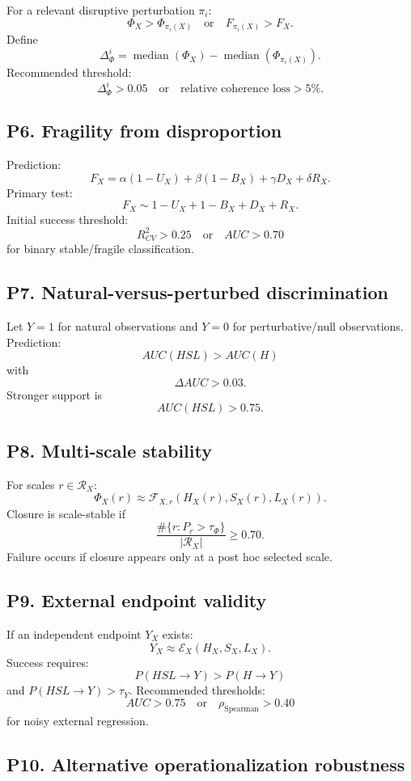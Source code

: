 \documentclass[11pt,a4paper]{article}
\begin{document}
For a relevant disruptive perturbation $\pi_i$:
\[
\Phi_X>\Phi_{\pi_i(X)}
\quad\text{or}\quad
F_{\pi_i(X)}>F_X.
\]
Define
\[
\Delta_\Phi^i=\operatorname{median}(\Phi_X)-\operatorname{median}(\Phi_{\pi_i(X)}).
\]
Recommended threshold:
\[
\Delta_\Phi^i>0.05
\quad\text{or}\quad
\text{relative coherence loss}>5\%.
\]

\subsection{P6. Fragility from disproportion}

Prediction:
\[
F_X=\alpha(1-U_X)+\beta(1-B_X)+\gamma D_X+\delta R_X.
\]
Primary test:
\[
F_X\sim 1-U_X+1-B_X+D_X+R_X.
\]
Initial success threshold:
\[
R^2_{CV}>0.25
\quad\text{or}\quad
AUC>0.70
\]
for binary stable/fragile classification.

\subsection{P7. Natural-versus-perturbed discrimination}

Let $Y=1$ for natural observations and $Y=0$ for perturbative/null observations.
Prediction:
\[
AUC(HSL)>AUC(H)
\]
with
\[
\Delta AUC>0.03.
\]
Stronger support is
\[
AUC(HSL)>0.75.
\]

\subsection{P8. Multi-scale stability}

For scales $r\in\mathcal{R}_X$:
\[
\Phi_X(r)\approx\mathcal{F}_{X,r}(H_X(r),S_X(r),L_X(r)).
\]
Closure is scale-stable if
\[
\frac{\#\{r:P_r>\tau_\Phi\}}{|\mathcal{R}_X|}\geq0.70.
\]
Failure occurs if closure appears only at a post hoc selected scale.

\subsection{P9. External endpoint validity}

If an independent endpoint $Y_X$ exists:
\[
Y_X\approx\mathcal{E}_X(H_X,S_X,L_X).
\]
Success requires:
\[
P(HSL\rightarrow Y)>P(H\rightarrow Y)
\]
and $P(HSL\rightarrow Y)>\tau_Y$.
Recommended thresholds:
\[
AUC>0.75
\quad\text{or}\quad
\rho_{\mathrm{Spearman}}>0.40
\]
for noisy external regression.

\subsection{P10. Alternative operationalization robustness}
\end{document}

